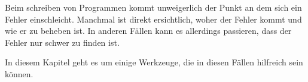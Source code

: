 

Beim schreiben von Programmen kommt unweigerlich der Punkt an dem sich ein Fehler einschleicht.
Manchmal ist direkt ersichtlich, woher der Fehler kommt und wie er zu beheben ist.
In anderen Fällen kann es allerdings  passieren, dass der Fehler nur schwer zu finden ist.

In diesem Kapitel geht es um einige Werkzeuge, die in diesen Fällen hilfreich sein können.

\begin{Infobox}


\end{Infobox}

\begin{Infobox}

\end{Infobox}
